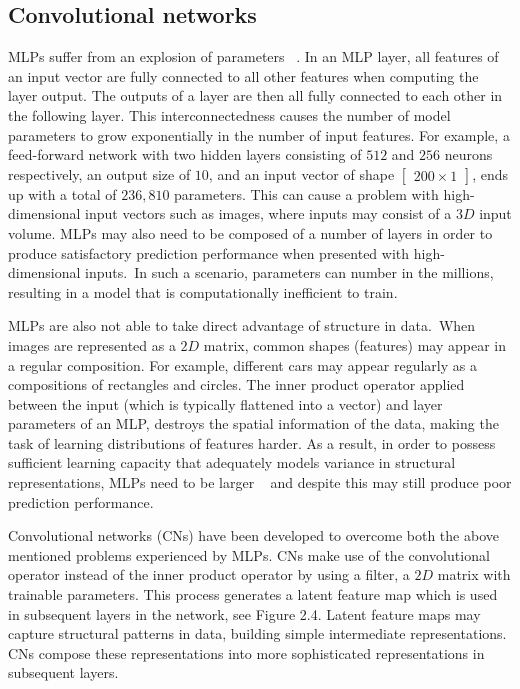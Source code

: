 
\subsection{Convolutional networks}

MLPs suffer from an explosion of parameters \unskip ~\citep{krizhevsky2012imagenet}. In an MLP layer, all features of an input vector are fully connected to all other features when computing the layer output. The outputs of a layer are then all fully connected to each other in the following layer. This interconnectedness causes the number of model parameters to grow exponentially in the number of input features. For example, a feed-forward network with two hidden layers consisting of $512$ and $256$ neurons respectively, an output size of $10$, and an input vector of shape $\left [ \begin{matrix} 200 \times 1 \end{matrix} \right] $, ends up with a total of $236,810$ parameters. This can cause a problem with high-dimensional input vectors such as images, where inputs may consist of a $ 3D $ input volume. MLPs may also need to be composed of a number of layers in order to produce satisfactory prediction performance when presented with high-dimensional inputs.\ In such a scenario, parameters can number in the millions, resulting in a model that is computationally inefficient to train. \par

\noindent MLPs are also not able to take direct advantage of structure in data.\ When images are represented as a $ 2D $ matrix, common shapes (features) may appear in a regular composition. For example, different cars may appear regularly as a compositions of rectangles and circles. The inner product operator applied between the input (which is typically flattened into a vector) and layer parameters of an MLP, destroys the spatial information of the data, making the task of learning distributions of features harder. As a result, in order to possess sufficient learning capacity that adequately models variance in structural representations, MLPs need to be larger \unskip ~\citep{lecun1998gradient} and despite this may still produce poor prediction performance. \par

\noindent Convolutional networks (CNs) have been developed to overcome both the above mentioned problems experienced by MLPs. CNs make use of the convolutional operator instead of the inner product operator by using a filter, a $ 2D $ matrix with trainable parameters. This process generates a latent feature map which is used in subsequent layers in the network, see Figure 2.4. Latent feature maps may capture structural patterns in data, building simple intermediate representations. CNs compose these representations into more sophisticated representations in subsequent layers. \par 

